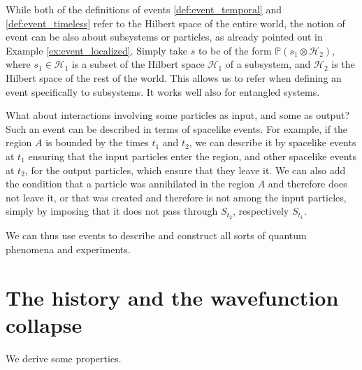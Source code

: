 \documentclass[12pt]{amsart}
\theoremstyle{definition}
\theoremstyle{plain}
\begin{document}
While both of the definitions of events \ref{def:event_temporal} and \ref{def:event_timeless} refer to the Hilbert space of the entire world, the notion of event can be also about subsystems or particles, as already pointed out in Example \ref{ex:event_localized}. Simply take $s$ to be of the form $\mathbb P( s_1\otimes\mathcal{H}_2)$, where $s_1\in\mathcal{H}_1$ is a subset of the Hilbert space $\mathcal{H}_1$ of a subsystem, and $\mathcal{H}_2$ is the Hilbert space of the rest of the world. This allows us to refer when defining an event specifically to subsystems. It works well also for entangled systems.

What about interactions involving some particles as input, and some as output? Such an event can be described in terms of spacelike events. For example, if the region $A$ is bounded by the times $t_1$ and $t_2$, we can describe it by spacelike events at $t_1$ ensuring that the input particles enter the region, and other spacelike events at $t_2$, for the output particles, which ensure that they leave it. We can also add the condition that a particle was annihilated in the region $A$ and therefore does not leave it, or that was created and therefore is not among the input particles, simply by imposing that it does not pass through $S_{t_2}$, respectively $S_{t_1}$.

We can thus use events to describe and construct all sorts of quantum phenomena and experiments. 


\section{The history and the wavefunction collapse}
\label{s:history_collapse}

We derive some properties.
\end{document}
